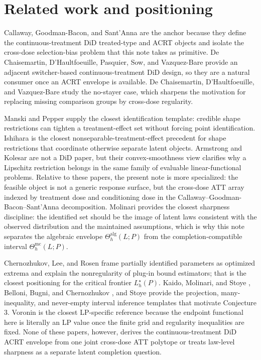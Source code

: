 \documentclass[11pt]{article}
\theoremstyle{definition}
\theoremstyle{plain}
\theoremstyle{remark}
\begin{document}
\section{Related work and positioning}
Callaway, Goodman-Bacon, and Sant'Anna \cite{CallawayGoodmanBaconSantAnna2021}
are the anchor because they define the continuous-treatment DiD treated-type
and ACRT objects and isolate the cross-dose selection-bias problem that this
note takes as primitive.  De Chaisemartin, D'Haultfoeuille, Pasquier, Sow, and
Vazquez-Bare \cite{deChaisemartinDHaultfoeuillePasquierSowVazquezBare2022}
provide an adjacent switcher-based continuous-treatment DiD design, so they are
a natural consumer once an ACRT envelope is available.  De Chaisemartin,
D'Haultfoeuille, and Vazquez-Bare
\cite{deChaisemartinDHaultfoeuilleVazquezBare2024} study the no-stayer case,
which sharpens the motivation for replacing missing comparison groups by
cross-dose regularity.

Manski and Pepper \cite{ManskiPepper2000} supply the closest identification
template: credible shape restrictions can tighten a treatment-effect set
without forcing point identification.  Ishihara \cite{Ishihara2017} is the
closest nonseparable-treatment-effect precedent for shape restrictions that
coordinate otherwise separate latent objects.  Armstrong and Kolesar
\cite{ArmstrongKolesar2018} are not a DiD paper, but their convex-smoothness
view clarifies why a Lipschitz restriction belongs in the same family of
evaluable linear-functional problems.  Relative to these papers, the present
note is more specialized: the feasible object is not a generic response
surface, but the cross-dose ATT array indexed by treatment dose and
conditioning dose in the Callaway--Goodman-Bacon--Sant'Anna decomposition.
Molinari \cite{Molinari2020} provides the closest sharpness discipline: the
identified set should be the image of latent laws consistent with the observed
distribution and the maintained assumptions, which is why this note separates
the algebraic envelope \(\Theta_h^{\mathrm{alg}}(L;P)\) from the
completion-compatible interval \(\Theta_h^{\mathrm{mc}}(L;P)\).

Chernozhukov, Lee, and Rosen \cite{ChernozhukovLeeRosen2013} frame partially
identified parameters as optimized extrema and explain the nonregularity of
plug-in bound estimators; that is the closest positioning for the critical
frontier \(L_h^\star(P)\).  Kaido, Molinari, and Stoye
\cite{KaidoMolinariStoye2019}, Belloni, Bugni, and Chernozhukov
\cite{BelloniBugniChernozhukov2018}, and Stoye \cite{Stoye2020} provide the
projection, many-inequality, and never-empty interval inference templates that
motivate Conjecture 3.  Voronin \cite{Voronin2025} is the closest LP-specific
reference because the endpoint functional here is literally an LP value once
the finite grid and regularity inequalities are fixed.  None of these papers,
however, derives the continuous-treatment DiD ACRT envelope from one joint
cross-dose ATT polytope or treats law-level sharpness as a separate latent
completion question.
\end{document}
